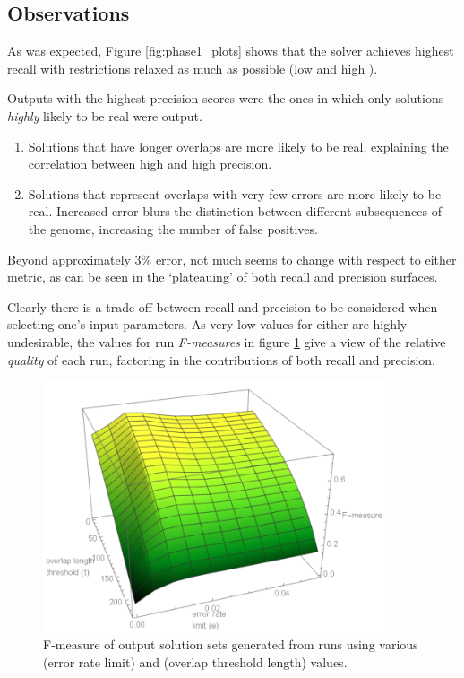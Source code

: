 \subsection{Observations}

As was expected, Figure \ref{fig:phase1_plots} shows that the solver achieves highest recall with restrictions relaxed as much as possible (low  and high ).

Outputs with the highest precision scores were the ones in which only \glspl{solution} \textit{highly} likely to be real were output.
\begin{enumerate}
\item Solutions that have longer overlaps are more likely to be real, explaining the correlation between high  and high precision.
\item Solutions that represent overlaps with very few errors are more likely to be real. Increased error blurs the distinction between different subsequences of the genome, increasing the number of false positives.
\end{enumerate}

Beyond approximately 3\% error, not much seems to change with respect to either metric, as can be seen in the `plateauing' of both recall and precision surfaces.

Clearly there is a trade-off between recall and precision to be considered when selecting one's input parameters. As very low values for either are highly undesirable, the values for run \textit{F-measures} in figure \ref{fig:phase1_02} give a view of the relative \textit{quality} of each run, factoring in the contributions of both recall and precision.


\begin{figure}[!htb]
\centering
\includegraphics[width=0.9\textwidth]{images/fmeasure.png}
\caption{F-measure of output solution sets generated from runs using various  (error rate limit) and  (overlap threshold length) values.}
\label{fig:phase1_02}
\end{figure}

